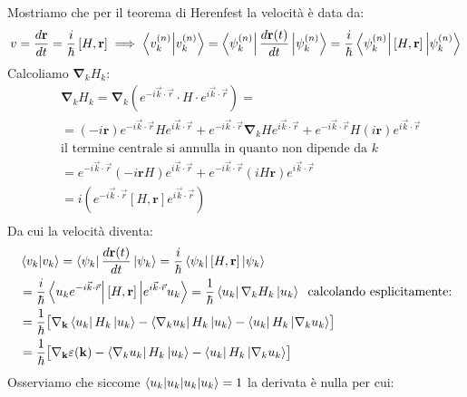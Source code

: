 Mostriamo che per il teorema di Herenfest la velocità è data da:
\[ v = \frac{d\mathbf{r}}{dt} = \frac{i}{\hbar}\left[ H, \mathbf{r}\right] \implies \braket{v_k^{(n)}} = \bra{\psi_k^{(n)}} \frac{d\mathbf{r}(t)}{dt} \ket{\psi_k^{(n)}} = \frac{i}{\hbar}\bra{\psi_k^{(n)}}\left[ H, \mathbf{r}\right]\ket{\psi_k^{(n)}} \]
Calcoliamo $\mathbf{\nabla}_kH_k$:
\begin{equation}
    \begin{split}
        &\mathbf{\nabla}_kH_k=\mathbf{\nabla}_k(e^{-i\vec{k}\cdot\vec{r}}\cdot H \cdot e^{i\vec{k}\cdot\vec{r}})=\\
        &=(-i\mathbf{r})e^{-i\vec{k}\cdot\vec{r}}He^{i\vec{k}\cdot\vec{r}} + e^{-i\vec{k}\cdot\vec{r}} \mathbf{\nabla}_k H e^{i\vec{k}\cdot\vec{r}} + e^{-i\vec{k}\cdot\vec{r}}H(i\mathbf{r})e^{i\vec{k}\cdot\vec{r}} \\
        &\text{il termine centrale si annulla in quanto non dipende da $k$}\\
        &=e^{-i\vec{k}\cdot\vec{r}}(-i\mathbf{r}H) e^{i\vec{k}\cdot\vec{r}} + e^{-i\vec{k}\cdot\vec{r}}(iH\mathbf{r}) e^{i\vec{k}\cdot\vec{r}}\\
        &=i(e^{-i\vec{k}\cdot\vec{r}}[H,\mathbf{r}]e^{i\vec{k}\cdot\vec{r}})\\
    \end{split}
\end{equation}
Da cui la velocità diventa:
\begin{equation}
    \begin{split}
        &\braket{v_k}= \bra{\psi_k} \frac{d\mathbf{r}(t)}{dt} \ket{\psi_k} = \frac{i}{\hbar}\bra{\psi_k}\left[ H, \mathbf{r}\right]\ket{\psi_k} \\
        & =\frac{i}{\hbar}\bra{u_k e^{-i\vec{k}\cdot\vec{r}}}\left[ H, \mathbf{r}\right]\ket{e^{i\vec{k}\cdot\vec{r}}u_k} = \frac{1}{\hbar} \bra{u_k}\mathbf{\nabla}_kH_k\ket{u_k} \hspace{0.2cm}\text{calcolando esplicitamente:}\\
        &=\frac{1}{\hbar} \bigl[\mathbf{\nabla_k} \bra{u_k} H_k \ket{u_k} -  \bra{\nabla_ku_k} H_k \ket{u_k} - \bra{u_k} H_k \ket{\nabla_k u_k}\bigr]\\
        &=\frac{1}{\hbar} \bigl[\mathbf{\nabla_k}\varepsilon(\mathbf{k}) -  \bra{\nabla_ku_k} H_k \ket{u_k} - \bra{u_k} H_k \ket{\nabla_k u_k}\bigr]\\
    \end{split}
\end{equation}
Osserviamo che siccome $\braket{u_k | u_k}=1$ la derivata è nulla per cui:
